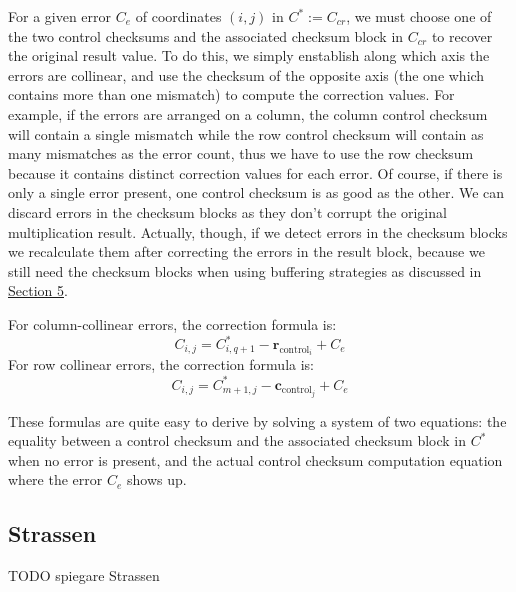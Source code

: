 For a given error $C_e$ of coordinates $(i,j)$ in $C^* := C_{cr}$, we must choose one of the two control checksums and the associated checksum block in $C_{cr}$ to recover the original result value.
To do this, we simply enstablish along which axis the errors are collinear, and use the checksum of the opposite axis (the one which contains more than one mismatch) to compute the correction values.
For example, if the errors are arranged on a column, the column control checksum will contain a single mismatch while the row control checksum will contain as many mismatches as the error count, thus we have to use the row checksum because it contains distinct correction values for each error.
Of course, if there is only a single error present, one control checksum is as good as the other.
We can discard errors in the checksum blocks
as they don't corrupt the original multiplication result.
Actually, though, if we detect errors in the checksum blocks
we recalculate them after correcting the errors in the result block,
because we still need the checksum blocks
when using buffering strategies as discussed in \hyperref[sec:strategies]{Section 5}.

For column-collinear errors, the correction formula is:
\[
  C_{i,j} = C^*_{i,q+1} - \mathbf{r}_{\text{control}_{i}} + C_e
\]
For row collinear errors, the correction formula is:
\[
  C_{i,j} = C^*_{m+1,j} - \mathbf{c}_{\text{control}_{j}} + C_e
\]

These formulas are quite easy to derive by solving a system of two equations:
the equality between a control checksum and the associated checksum block in $C^*$ when no error is present,
and the actual control checksum computation equation where the error $C_e$ shows up.

\subsection{Strassen}

TODO spiegare Strassen
